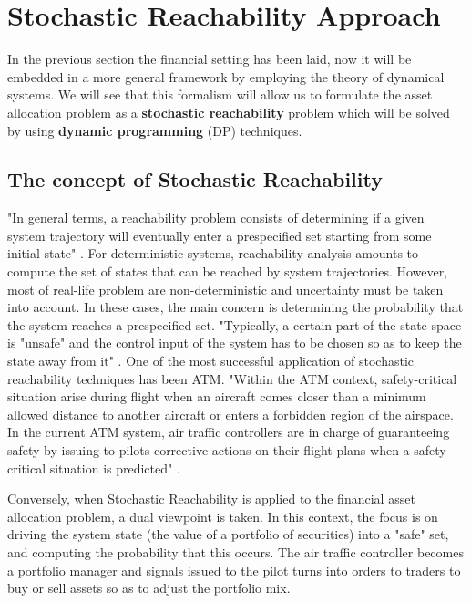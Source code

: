 \section{Stochastic Reachability Approach}
In the previous section the financial setting has been laid, now it will be embedded in a more general framework by employing the theory of dynamical systems. We will see that this formalism will allow us to formulate the asset allocation problem as a \textbf{stochastic reachability} problem which will be solved by using \textbf{dynamic programming} (DP) techniques.
\subsection{The concept of Stochastic Reachability}
"In general terms, a reachability problem consists of determining if a given system trajectory will eventually enter a prespecified set starting from some initial state" \cite{Boj2012}. For deterministic systems, reachability analysis amounts to compute the set of states that can be reached by system trajectories. However, most of real-life problem are non-deterministic and uncertainty must be taken into account. In these cases, the main concern is determining the probability that the system reaches a prespecified set. "Typically, a certain part of the state space is "unsafe" and the control input of the system has to be chosen so as to keep the state away from it" \cite{Boj2012}. One of the most successful application of stochastic reachability techniques has been \gls{ATM}. "Within the \gls{ATM} context, safety-critical situation arise during flight when an aircraft comes closer than a minimum allowed distance to another aircraft or enters a forbidden region of the airspace. In the current \gls{ATM} system, air traffic controllers are in charge of guaranteeing safety by issuing to pilots corrective actions on their flight plans when a safety-critical situation is predicted" \cite{Boj2012}.

Conversely, when Stochastic Reachability is applied to the financial asset allocation problem, a dual viewpoint is taken. In this context, the focus is on driving the system state (the value of a portfolio of securities) into a "safe" set, and computing the probability that this occurs. The air traffic controller becomes a portfolio manager and signals issued to the pilot turns into orders to traders to buy or sell assets so as to adjust the portfolio mix.
